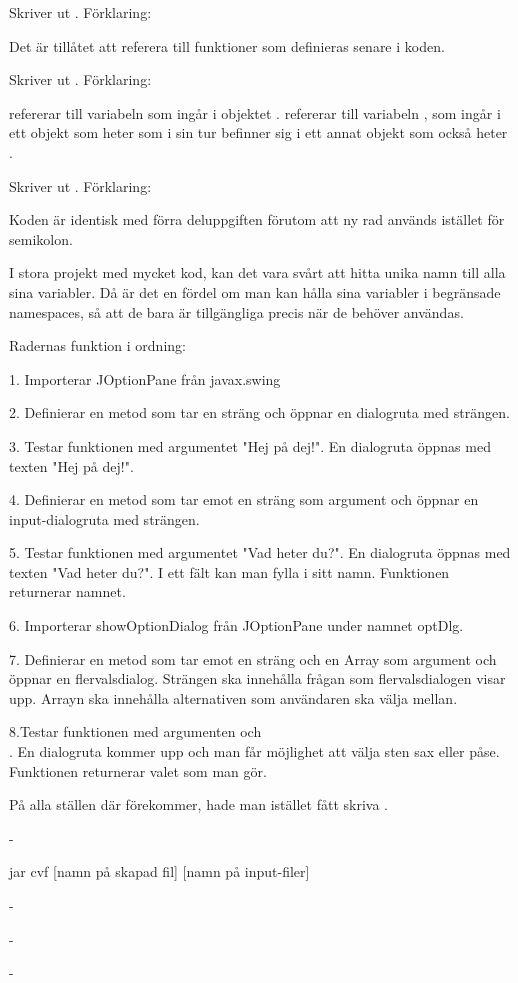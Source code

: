 \Subtask Skriver ut . Förklaring:

Det är tillåtet att referera till funktioner som definieras senare i koden.

\Subtask Skriver ut . Förklaring:

 refererar till variabeln  som ingår i objektet .
 refererar till variabeln , som ingår i ett objekt som heter  som i sin tur befinner sig i ett annat objekt som också heter .

\Subtask Skriver ut . Förklaring:

Koden är identisk med förra deluppgiften förutom att ny rad används istället för semikolon.

\Subtask I stora projekt med mycket kod, kan det vara svårt att hitta unika namn till alla sina variabler. Då är det en fördel om man kan hålla sina variabler i begränsade namespaces, så att de bara är tillgängliga precis när de behöver användas. 

\Task 

\Subtask {}

\Subtask Radernas funktion i ordning:

1. Importerar JOptionPane från javax.swing

2. Definierar en metod som tar en sträng och öppnar en dialogruta med strängen.

3. Testar funktionen med argumentet "Hej på dej!". En dialogruta öppnas med texten "Hej på dej!".

4. Definierar en metod som tar emot en sträng som argument och öppnar en input-dialogruta med strängen.

5. Testar funktionen med argumentet "Vad heter du?". En dialogruta öppnas med texten "Vad heter du?". I ett fält kan man fylla i sitt namn. Funktionen returnerar namnet.

6. Importerar showOptionDialog från JOptionPane under namnet optDlg.

7. Definierar en metod som tar emot en sträng och en Array som argument och öppnar en flervalsdialog. Strängen ska innehålla frågan som flervalsdialogen visar upp. Arrayn ska innehålla alternativen som användaren ska välja mellan.

8.Testar funktionen med argumenten  och \\ . En dialogruta kommer upp och man får möjlighet att välja sten sax eller påse. Funktionen returnerar valet som man gör.

\Subtask På alla ställen där  förekommer, hade man istället fått skriva .

\Subtask -

\Task 
\Subtask jar cvf [namn på skapad fil] [namn på input-filer]

\Subtask -

\Task 
\Subtask -

\Subtask -
